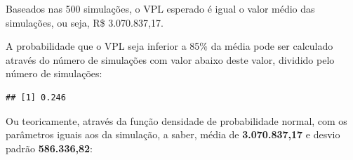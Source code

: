 \documentclass[a4paper]{article}
\newenvironment{Shaded}{\begin{snugshade}}{\end{snugshade}}
\newcommand{\KeywordTok}[1]{\textcolor[rgb]{0.13,0.29,0.53}{\textbf{#1}}}
\newcommand{\DataTypeTok}[1]{\textcolor[rgb]{0.13,0.29,0.53}{#1}}
\newcommand{\FloatTok}[1]{\textcolor[rgb]{0.00,0.00,0.81}{#1}}
\newcommand{\StringTok}[1]{\textcolor[rgb]{0.31,0.60,0.02}{#1}}
\newcommand{\OperatorTok}[1]{\textcolor[rgb]{0.81,0.36,0.00}{\textbf{#1}}}
\newcommand{\NormalTok}[1]{#1}
\begin{document}

\begin{Shaded}
\end{Shaded}

Baseados nas 500 simulações, o VPL esperado é igual o valor médio das
simulações, ou seja, R\$ 3.070.837,17.

A probabilidade que o VPL seja inferior a 85\% da média pode ser
calculado através do número de simulações com valor abaixo deste valor,
dividido pelo número de simulações:

\begin{Shaded}
\end{Shaded}

\begin{verbatim}
## [1] 0.246
\end{verbatim}

Ou teoricamente, através da função densidade de probabilidade normal,
com os parâmetros iguais aos da simulação, a saber, média de
\textbf{3.070.837,17} e desvio padrão \textbf{586.336,82}:

\begin{Shaded}
\end{Shaded}
\end{document}
